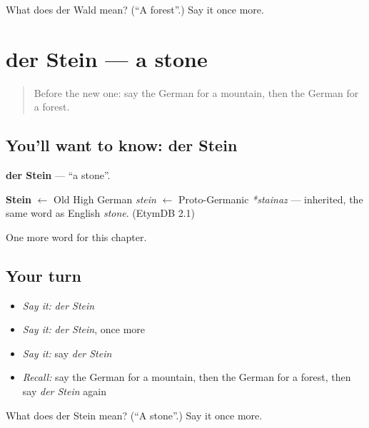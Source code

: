 \begin{tcolorbox}[breakable,colback=teal!4,colframe=teal!35!black,title={Before you move on}]
What does der Wald mean? (\textquotedblleft{}A forest\textquotedblright{}.) Say it once more.
\end{tcolorbox}
\section[der Stein]{der Stein — a stone}

\label{lesson:GE-C83-stein}



\begin{quote}
Before the new one: say the German for a mountain, then the German for a forest.
\end{quote}

\subsection*{You'll want to know: der Stein}
\textbf{der Stein} — \textquotedblleft{}a stone\textquotedblright{}.

\begin{cousinweb}
\textbf{Stein} $\leftarrow$ Old High German \emph{stein} $\leftarrow$ Proto-Germanic \emph{*stainaz} — inherited, the same word as English \emph{stone}. (EtymDB 2.1)
\end{cousinweb}

\begin{grammarlens}[title={What you've built}]
One more word for this chapter.
\end{grammarlens}

\subsection*{Your turn}
\begin{itemize}
\raggedright
  \item \emph{Say it:} \emph{der Stein}
  \item \emph{Say it:} \emph{der Stein}, once more
  \item \emph{Say it:} say \emph{der Stein}
  \item \emph{Recall:} say the German for a mountain, then the German for a forest, then say \emph{der Stein} again
\end{itemize}

\begin{tcolorbox}[breakable,colback=teal!4,colframe=teal!35!black,title={Before you move on}]
What does der Stein mean? (\textquotedblleft{}A stone\textquotedblright{}.) Say it once more.
\end{tcolorbox}
